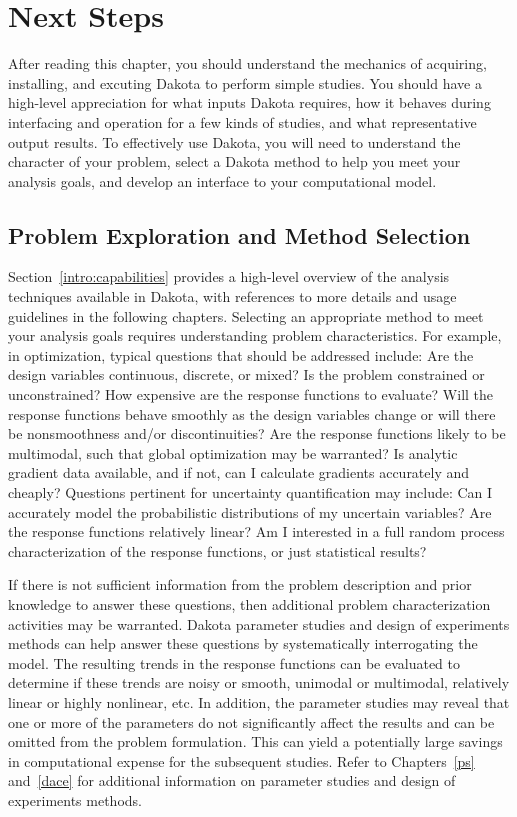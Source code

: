 \section{Next Steps}\label{tutorial:nextsteps}

After reading this chapter, you should understand the mechanics of
acquiring, installing, and excuting Dakota to perform simple studies.
You should have a high-level appreciation for what inputs Dakota
requires, how it behaves during interfacing and operation for a few
kinds of studies, and what representative output results.  To
effectively use Dakota, you will need to understand the character of
your problem, select a Dakota method to help you meet your analysis
goals, and develop an interface to your computational model.

\subsection{Problem Exploration and Method Selection}\label{tutorial:exploration}

Section~\ref{intro:capabilities} provides a high-level overview of the
analysis techniques available in Dakota, with references to more
details and usage guidelines in the following chapters.  Selecting an
appropriate method to meet your analysis goals requires understanding
problem characteristics.  For example, in optimization, typical
questions that should be addressed include: Are the design variables
continuous, discrete, or mixed? Is the problem constrained or
unconstrained? How expensive are the response functions to evaluate?
Will the response functions behave smoothly as the design variables
change or will there be nonsmoothness and/or discontinuities? Are the
response functions likely to be multimodal, such that global
optimization may be warranted? Is analytic gradient data available,
and if not, can I calculate gradients accurately and cheaply?
Questions pertinent for uncertainty quantification may include: Can I
accurately model the probabilistic distributions of my uncertain
variables? Are the response functions relatively linear? Am I
interested in a full random process characterization of the response
functions, or just statistical results?

If there is not sufficient information from the problem description
and prior knowledge to answer these questions, then additional problem
characterization activities may be warranted. Dakota parameter studies
and design of experiments methods can help answer these questions by
systematically interrogating the model.  The resulting trends in the
response functions can be evaluated to determine if these trends are
noisy or smooth, unimodal or multimodal, relatively linear or highly
nonlinear, etc. In addition, the parameter studies may reveal that one
or more of the parameters do not significantly affect the results and
can be omitted from the problem formulation. This can yield a
potentially large savings in computational expense for the subsequent
studies. Refer to Chapters~\ref{ps} and~\ref{dace} for additional
information on parameter studies and design of experiments methods.

